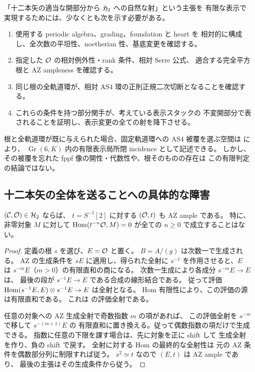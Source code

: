 「十二本矢の適当な開部分から \(\mathfrak H_2\) への自然な射」という主張を
有限な表示で実現するためには、少なくとも次を示す必要がある。
\begin{enumerate}
\item 使用する periodic algebra、grading、foundation と heart を
相対的に構成し、全次数の平坦性、noetherian 性、基底変更を確認する。
\item 指定した \(\mathcal O\) の相対例外性・rank 条件、相対 Serre 公式、
適合する完全平方根と AZ ampleness を確認する。
\item 同じ根の全軌道環が、相対 AS4 環の正則正規二次切断となることを確認する。
\item これらの条件を持つ部分関手が、考えている表示スタックの
不変開部分で表されることを証明し、表示変更の全ての射を降下させる。
\end{enumerate}
根と全軌道環が既に与えられた場合、固定軌道環への AS4 被覆を選ぶ空間は
\cite[\texttt{thm:relative-finite-as-cover}]{QuadricModuli2026} により、
\(\operatorname{Gr}(6,K)\) 内の有限表示局所閉 incidence として記述できる。
しかし、その被覆を忘れた fppf 像の開性・代数性や、根そのものの存在は
この有限判定の結論ではない。

\subsection{十二本矢の全体を送ることへの具体的な障害}

\begin{lemma}
\label{lem:qa-antiserre-necessary}
\((\mathcal C,\mathcal O)\in\mathcal H_2\) ならば、
\(t=S^{-1}[2]\) に対する \((\mathcal O,t)\) も AZ ample である。
特に、非零対象 \(M\) に対して
\(\operatorname{Hom}(t^{-n}\mathcal O,M)=0\) が全ての \(n\ge0\) で成立することはない。
\end{lemma}
\begin{proof}
定義の根 \(s\) を選び、\(E=\mathcal O\) と置く。
\(B=A/(g)\) は次数一で生成される。
AZ の生成条件を \(sE\) に適用し、得られた全射に
\(s^{-1}\) を作用させると、\(E\) は
\(s^{-m}E\)（\(m>0\)）の有限直和の商になる。
次数一生成により各成分 \(s^{-m}E\to E\) は、
最後の段が \(s^{-1}E\to E\) である合成の線形結合である。
従って評価 \(\operatorname{Hom}(s^{-1}E,E)\otimes s^{-1}E\to E\) は全射となる。
Hom 有限性により、この評価の源は有限直和である。
これは \cite[\texttt{lem:ample-square-from-generation}]{QuadricIntrinsic2026}
の評価全射である。

任意の対象への AZ 生成全射で奇数指数 \(m\) の項があれば、
この評価全射を \(s^{-m}\) で移して \(s^{-(m+1)}E\) の
有限直和に置き換える。従って偶数指数の項だけで生成できる。
指数に任意の下限を課す場合は、先に対象を正に shift して
生成全射を作り、負の shift で戻す。
全射に対する Hom の最終的な全射性は
元の AZ 条件を偶数部分列に制限すれば従う。
\(s^2\simeq t\) なので \((E,t)\) は AZ ample であり、
最後の主張はその生成条件から従う。
\end{proof}

